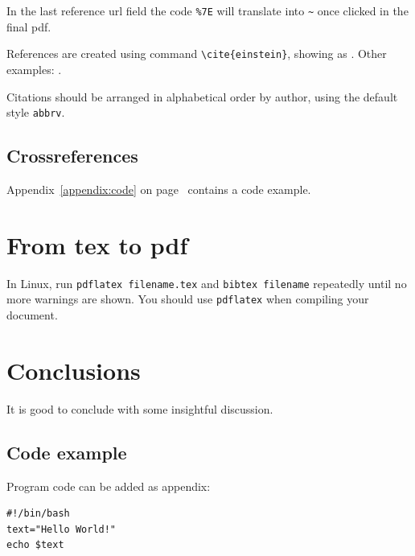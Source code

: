 \documentclass[english,twoside,openright]{UH_DS_MSc}
\begin{document}
In the last reference url field the code \verb+%7E+ will translate into \verb+~+ once clicked in the final pdf.

References are created using command \texttt{\textbackslash cite\{einstein\}}, showing as \cite{einstein}. Other examples: \cite{latexcompanion,knuthwebsite}.

Citations should be arranged in alphabetical order by author, using the default style \texttt{abbrv}.



\section{Crossreferences}

Appendix~\ref{appendix:code} on page~\pageref{appendix:code} contains a code example.

\chapter{From tex to pdf}

In Linux, run \texttt{pdflatex filename.tex} and \texttt{bibtex
  filename} repeatedly until no more warnings are shown. You should
use \texttt{pdflatex} when compiling your document.
 
\chapter{Conclusions\label{chapter:conclusions}}

It is good to conclude with some insightful discussion. 


\cleardoublepage %



\begin{appendices}
\myappendixtitle

\chapter{Code example\label{appendix:code}}
Program code can be added as appendix:
\begin{verbatim}
#!/bin/bash          
text="Hello World!"
echo $text
\end{verbatim}

\end{appendices}
\end{document}
